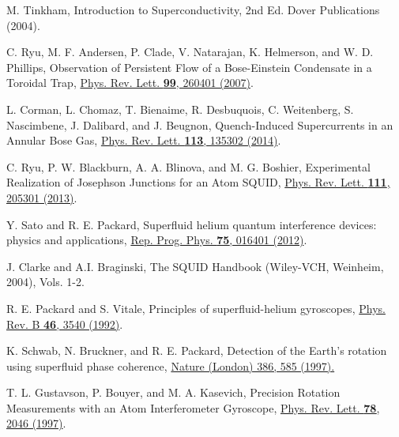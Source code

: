 \documentclass[twocolumn,prl,floatfix,citeautoscript,nofootinbib]{revtex4-1}
\begin{document}
\begin{thebibliography}{99}
 M. Tinkham, Introduction to Superconductivity, 2nd Ed.
Dover Publications (2004).

 C. Ryu, M. F. Andersen, P. Clade, V. Natarajan, K.
Helmerson, and W. D. Phillips, {Observation of Persistent Flow of a
Bose-Einstein Condensate in a Toroidal Trap}, \href{https://doi.org/10.1103/PhysRevLett.99.260401}%
{Phys. Rev. Lett. \textbf{99}, 260401 (2007)}.



 L. Corman, L. Chomaz, T. Bienaime, R. Desbuquois, C.
Weitenberg, S. Nascimbene, J. Dalibard, and J. Beugnon, {Quench-Induced
Supercurrents in an Annular Bose Gas}, \href{https://doi.org/10.1103/PhysRevLett.113.135302}%
{Phys. Rev. Lett. \textbf{113}, 135302 (2014)}.


 C. Ryu, P. W. Blackburn, A. A. Blinova, and M. G. Boshier,
{Experimental Realization of Josephson Junctions for an Atom SQUID}, \href{https://doi.org/ 10.1103/PhysRevLett.111.205301}%
{Phys. Rev. Lett. \textbf{111}, 205301 (2013)}.

 Y. Sato and R. E. Packard, {Superfluid helium quantum
interference devices: physics and applications}, \href{https://doi.org/10.1088/0034-4885/75/1/016401}%
{Rep. Prog. Phys. \textbf{75}, 016401 (2012)}.


 J. Clarke and A.I. Braginski, The SQUID Handbook
(Wiley-VCH, Weinheim, 2004), Vols. 1-2.

 R. E. Packard and S. Vitale, {Principles of
superfluid-helium gyroscopes}, \href{https://doi.org/10.1103/PhysRevB.46.3540}%
{Phys. Rev. B \textbf{46}, 3540 (1992)}.

 K. Schwab, N. Bruckner, and R. E. Packard, Detection of
the Earth's rotation using superfluid phase coherence, \href{http://dx.doi.org/10.1038/386585a0}%
{Nature (London) 386, 585 (1997).}

 T. L. Gustavson, P. Bouyer, and M. A. Kasevich, {%
Precision Rotation Measurements with an Atom Interferometer Gyroscope},
\href{https://doi.org/ 10.1103/PhysRevLett.78.2046}{Phys. Rev. Lett. \textbf{%
78}, 2046 (1997)}.



\end{thebibliography}
\end{document}
